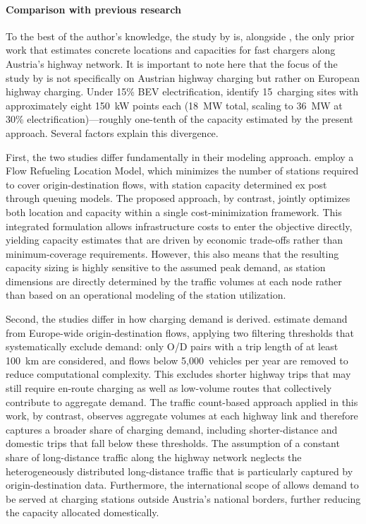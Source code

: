 \paragraph*{Comparison with previous research} To the best of the author's knowledge, the study by \citet{Jochem2019} is, alongside \citet{en15062147}, the only prior work that estimates concrete locations and capacities for fast chargers along Austria's highway network. It is important to note here that the focus of the study by \citet{Jochem2019} is not specifically on Austrian highway charging but rather on European highway charging. Under 15\% BEV electrification, \citet{Jochem2019} identify 15~charging sites with approximately eight 150~kW points each (18~MW total, scaling to 36~MW at 30\% electrification)---roughly one-tenth of the capacity estimated by the present approach. Several factors explain this divergence.

First, the two studies differ fundamentally in their modeling approach. \citet{Jochem2019} employ a Flow Refueling Location Model, which minimizes the number of stations required to cover origin-destination flows, with station capacity determined ex post through queuing models. The proposed approach, by contrast, jointly optimizes both location and capacity within a single cost-minimization framework. This integrated formulation allows infrastructure costs to enter the objective directly, yielding capacity estimates that are driven by economic trade-offs rather than minimum-coverage requirements. However, this also means that the resulting capacity sizing is highly sensitive to the assumed peak demand, as station dimensions are directly determined by the traffic volumes at each node rather than based on an operational modeling of the station utilization.

Second, the studies differ in how charging demand is derived. \citet{Jochem2019} estimate demand from Europe-wide origin-destination flows, applying two filtering thresholds that systematically exclude demand: only O/D pairs with a trip length of at least 100~km are considered, and flows below 5,000~vehicles per year are removed to reduce computational complexity. This excludes shorter highway trips that may still require en-route charging as well as low-volume routes that collectively contribute to aggregate demand. The traffic count-based approach applied in this work, by contrast, observes aggregate volumes at each highway link and therefore captures a broader share of charging demand, including shorter-distance and domestic trips that fall below these thresholds. The assumption of a constant share of long-distance traffic along the highway network neglects the heterogeneously distributed long-distance traffic that is particularly captured by origin-destination data. Furthermore, the international scope of \citet{Jochem2019} allows demand to be served at charging stations outside Austria's national borders, further reducing the capacity allocated domestically.


